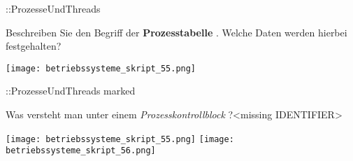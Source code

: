 \documentclass{article}
\begin{document}
\begin{tcolorbox}[colback=white!10!white,colframe=lightgray!75!black,
  savelowerto=\jobname_ex.tex]

\begin{center}
::ProzesseUndThreads

\end{center}

\tcblower

\justifying

\end{tcolorbox}
\begin{tcolorbox}[colback=white!10!white,colframe=lightgray!75!black,
  savelowerto=\jobname_ex.tex]

\begin{center}
Beschreiben Sie den Begriff der 
\textbf{Prozesstabelle
}.
Welche Daten werden hierbei festgehalten?

\end{center}

\tcblower

\justifying
\texttt{[image: betriebssysteme\_skript\_55.png]}

\end{tcolorbox}
\begin{tcolorbox}[colback=white!10!white,colframe=lightgray!75!black,
  savelowerto=\jobname_ex.tex]

\begin{center}
::ProzesseUndThreads marked

\end{center}

\tcblower

\justifying

\end{tcolorbox}
\begin{tcolorbox}[colback=white!10!white,colframe=lightgray!75!black,
  savelowerto=\jobname_ex.tex]

\begin{center}
Was versteht man unter einem 
\textit{Prozesskontrollblock
}?<missing IDENTIFIER>

\end{center}

\tcblower

\justifying
\texttt{[image: betriebssysteme\_skript\_55.png]}
\texttt{[image: betriebssysteme\_skript\_56.png]}

\end{tcolorbox}
\end{document}
